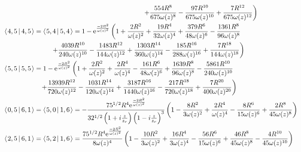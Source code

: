 \documentclass[11pt]{amsart}
\makeatletter
\newcommand{\e}{{\rm e}}				%
\newcommand{\msp}[1]{\mspace{#1mu}}		%
\newcommand{\0}{\varnothing}		%
\newcommand{\brac}[2]{\left\langle\msp{2} #1\left\lvert \msp{3.5} #2 \right.\right\rangle}	%
\newcommand{\1}{!}
\newcommand{\2}{@}
\newcommand{\3}{\#}
\newcommand{\4}{\$}
\newcommand{\5}{\%}
\newcommand{\6}{$^\wedge$}
\newcommand{\7}{\&}
\newcommand{\8}{*}
\newcommand{\9}{(}
\makeatother
\begin{document}
\begin{align*}
\\
&
\msp{380}\left.+\frac{554R^8}{675\omega(z)^8}-\frac{97R^{10}}{675\omega(z)^{10}}+\frac{7R^{12}}{675\omega(z)^{12}}\right)
\\
&
\brac{4,5}{4,5} = \brac{5,4}{5,4} =1-\e^{\frac{-2R^2}{\omega(z)^2}}\left(1+\frac{2R^2}{\omega(z)^2}+\frac{19R^4}{32\omega(z)^4}+\frac{379R^6}{48\omega(z)^6}-\frac{1361R^8}{96\omega(z)^8}\right.
\\
&
\msp{130}\left.+\frac{4039R^{10}}{240\omega(z)^{10}}-\frac{1483R^{12}}{144\omega(z)^{12}}+\frac{1303R^{14}}{360\omega(z)^{14}}-\frac{185R^{16}}{288\omega(z)^{16}}+\frac{7R^{18}}{144\omega(z)^{18}}\right)
\\
&
\brac{5,5}{5,5} = 1-\e^{\frac{-2R^2}{\omega(z)^2}}\left(1+\frac{2R^2}{\omega(z)^2}+\frac{2R^4}{\omega(z)^4}-\frac{161R^6}{48\omega(z)^6}+\frac{1639R^8}{96\omega(z)^8}-\frac{5861R^{10}}{240\omega(z)^{10}}\right.
\\
&
\msp{100}\left.+\frac{13939R^{12}}{720\omega(z)^{12}}-\frac{1031R^{14}}{120\omega(z)^{14}}+\frac{3187R^{16}}{1440\omega(z)^{16}}-\frac{217R^{18}}{720\omega(z)^{18}}+\frac{7R^{20}}{400\omega(z)^{20}}\right)
\\
&
\brac{0,5}{6,1} = \brac{5,0}{1,6} = -\frac{75^{1/2}R^4\e^{\frac{-2R^2}{\omega(z)^2}}}{32^{1/2}\left(1+i\frac{z}{z_r}\right)\left(1-i\frac{z}{z_r}\right)^3}\left(1-\frac{8R^2}{3\omega(z)^2}+\frac{2R^4}{\omega(z)^4}-\frac{8R^6}{15\omega(z)^6}+\frac{2R^8}{45\omega(z)^8}\right)
\\
&
\brac{2,5}{6,1} = \brac{5,2}{1,6} = \frac{75^{1/2}R^4\e^{\frac{-2R^2}{\omega(z)^2}}}{8\omega(z)^4}\left(1-\frac{10R^2}{3\omega(z)^2}+\frac{16R^4}{3\omega(z)^4}-\frac{56R^6}{15\omega(z)^6}+\frac{46R^8}{45\omega(z)^8}-\frac{4R^{10}}{45\omega(z)^{10}}\right)
\end{align*}
\end{document}
